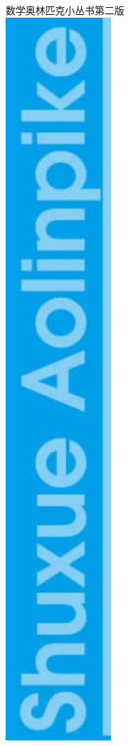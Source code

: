 \documentclass[10pt]{article}
\begin{document}
数学奥林匹克小丛书第二版\\
\includegraphics[max width=\textwidth, center]{2024_10_30_bd799899fef40368a068g-001}
\end{document}
